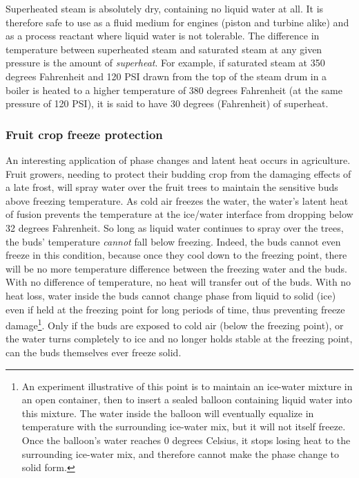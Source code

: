 Superheated steam is absolutely dry, containing no liquid water at all.  It is therefore safe to use as a fluid medium for engines (piston and turbine alike) and as a process reactant where liquid water is not tolerable.  The difference in temperature between superheated steam and saturated steam at any given pressure is the amount of \textit{superheat}.  For example, if saturated steam at 350 degrees Fahrenheit and 120 PSI drawn from the top of the steam drum in a boiler is heated to a higher temperature of 380 degrees Fahrenheit (at the same pressure of 120 PSI), it is said to have 30 degrees (Fahrenheit) of superheat.  





\filbreak
\subsubsection{Fruit crop freeze protection}

An interesting application of phase changes and latent heat occurs in agriculture.  Fruit growers, needing to protect their budding crop from the damaging effects of a late frost, will spray water over the fruit trees to maintain the sensitive buds above freezing temperature.  As cold air freezes the water, the water's latent heat of fusion prevents the temperature at the ice/water interface from dropping below 32 degrees Fahrenheit.  So long as liquid water continues to spray over the trees, the buds' temperature \textit{cannot} fall below freezing.  Indeed, the buds cannot even freeze in this condition, because once they cool down to the freezing point, there will be no more temperature difference between the freezing water and the buds.  With no difference of temperature, no heat will transfer out of the buds.  With no heat loss, water inside the buds cannot change phase from liquid to solid (ice) even if held at the freezing point for long periods of time, thus preventing freeze damage\footnote{An experiment illustrative of this point is to maintain an ice-water mixture in an open container, then to insert a sealed balloon containing liquid water into this mixture.  The water inside the balloon will eventually equalize in temperature with the surrounding ice-water mix, but it will not itself freeze.  Once the balloon's water reaches 0 degrees Celsius, it stops losing heat to the surrounding ice-water mix, and therefore cannot make the phase change to solid form.}.  Only if the buds are exposed to cold air (below the freezing point), or the water turns completely to ice and no longer holds stable at the freezing point, can the buds themselves ever freeze solid.




